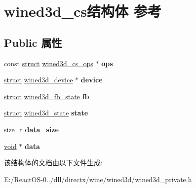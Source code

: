 \hypertarget{structwined3d__cs}{}\section{wined3d\+\_\+cs结构体 参考}
\label{structwined3d__cs}
\subsection*{Public 属性}
\begin{DoxyCompactItemize}
\item 
\mbox{\label{structwined3d__cs_a896f32b310c7e10bcfd5dff2912bd544}} 
const \hyperlink{interfacestruct}{struct} \hyperlink{structwined3d__cs__ops}{wined3d\+\_\+cs\+\_\+ops} $\ast$ {\bfseries ops}
\item 
\mbox{\label{structwined3d__cs_ad1e1d63e4a7cbdde65ba7ef61e8a3f35}} 
\hyperlink{interfacestruct}{struct} \hyperlink{structwined3d__device}{wined3d\+\_\+device} $\ast$ {\bfseries device}
\item 
\mbox{\label{structwined3d__cs_a98affd5026aafba109f5f88ab1731d25}} 
\hyperlink{interfacestruct}{struct} \hyperlink{structwined3d__fb__state}{wined3d\+\_\+fb\+\_\+state} {\bfseries fb}
\item 
\mbox{\label{structwined3d__cs_ac5947113a85a4ff81f4d6a0ec68b2391}} 
\hyperlink{interfacestruct}{struct} \hyperlink{structwined3d__state}{wined3d\+\_\+state} {\bfseries state}
\item 
\mbox{\label{structwined3d__cs_a566c35e342bc708de15a403a9304456e}} 
size\+\_\+t {\bfseries data\+\_\+size}
\item 
\mbox{\label{structwined3d__cs_a200482368bbb855a7804fcd2336d8c7d}} 
\hyperlink{interfacevoid}{void} $\ast$ {\bfseries data}
\end{DoxyCompactItemize}


该结构体的文档由以下文件生成\+:\begin{DoxyCompactItemize}
\item 
E\+:/\+React\+O\+S-\/0../dll/directx/wine/wined3d/wined3d\+\_\+private.\+h\end{DoxyCompactItemize}

